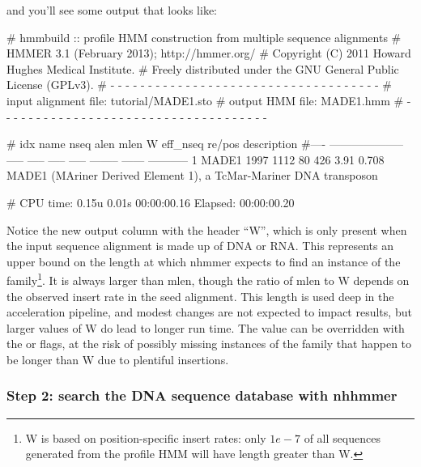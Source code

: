 
and you'll see some output that looks like:

\begin{samepage}
\begin{sreoutput}
# hmmbuild :: profile HMM construction from multiple sequence alignments
# HMMER 3.1 (February 2013); http://hmmer.org/
# Copyright (C) 2011 Howard Hughes Medical Institute.
# Freely distributed under the GNU General Public License (GPLv3).
# - - - - - - - - - - - - - - - - - - - - - - - - - - - - - - - - - - - -
# input alignment file:             tutorial/MADE1.sto
# output HMM file:                  MADE1.hmm
# - - - - - - - - - - - - - - - - - - - - - - - - - - - - - - - - - - - -

# idx name                  nseq  alen  mlen     W eff_nseq re/pos description
#---- -------------------- ----- ----- ----- ----- -------- ------ -----------
1     MADE1                 1997  1112    80   426     3.91  0.708 MADE1 (MAriner Derived Element 1), a TcMar-Mariner DNA transposon

# CPU time: 0.15u 0.01s 00:00:00.16 Elapsed: 00:00:00.20
\end{sreoutput}
\end{samepage}

Notice the new output column with the header ``W'', which is only present when
the input sequence alignment is made up of DNA or RNA. This represents an upper
bound on the length at which nhmmer expects to find an instance of the 
family\footnote{W is based on position-specific insert rates: only
$1e-7$ of all sequences generated from the profile HMM will have length 
greater than W.}. 
It is always larger than mlen, though the ratio of mlen to W depends on the
observed insert rate in the seed alignment. This length is used deep in the
acceleration pipeline, and modest changes are not expected to impact results,
but larger values of W do lead to longer run time. The value can be overridden
with the  or  flags, at the risk of
possibly missing instances of the family that happen to be longer than W due to
plentiful insertions.



\subsubsection{Step 2: search the DNA sequence database with nhhmmer}

